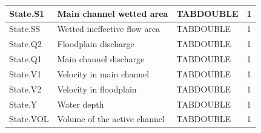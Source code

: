 \documentclass[a4paper,11pt]{article}
\begin{document}
\begin{landscape}
\begin{table}[ht]
\begin{center}
\begin{tabular}{|l|l|l|l|}
\hline  State.S1 & Main channel wetted area & TABDOUBLE & 1 \\
\hline  State.SS & Wetted ineffective flow area & TABDOUBLE & 1 \\
\hline  State.Q2 & Floodplain discharge & TABDOUBLE & 1 \\
\hline  State.Q1 & Main channel discharge & TABDOUBLE & 1 \\
\hline  State.V1 & Velocity in main channel & TABDOUBLE & 1 \\
\hline  State.V2 & Velocity in floodplain & TABDOUBLE & 1 \\
\hline  State.Y & Water depth & TABDOUBLE & 1 \\
\hline  State.VOL & Volume of the active channel & TABDOUBLE & 1 \\
\hline

\end{tabular} 
\end{center}
\end{table}
\begin{table}[ht]
\begin{center}
\begin{tabular}{|l|l|l|l|}


\end{tabular}
\end{center}
\end{table}
\end{landscape}
\end{document}
